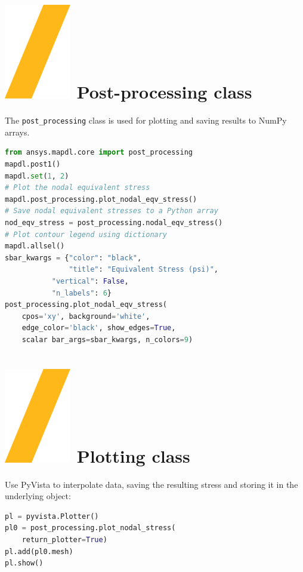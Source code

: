 \documentclass[9pt,landscape]{article}
\begin{document}
\begin{multicols}{3}
\section{\includegraphics[height=\fontcharht\font`\S]{slash.png} Post-processing class}
The \texttt{post_processing} class is used for plotting and saving results to NumPy arrays.
\begin{lstlisting}[language=Python]
from ansys.mapdl.core import post_processing
mapdl.post1()
mapdl.set(1, 2)
# Plot the nodal equivalent stress
mapdl.post_processing.plot_nodal_eqv_stress()
# Save nodal equivalent stresses to a Python array
nod_eqv_stress = post_processing.nodal_eqv_stress()
# Plot contour legend using dictionary
mapdl.allsel()
sbar_kwargs = {"color": "black",
               "title": "Equivalent Stress (psi)",
	       "vertical": False,
	       "n_labels": 6}
post_processing.plot_nodal_eqv_stress(
    cpos='xy', background='white',
    edge_color='black', show_edges=True,
    scalar bar_args=sbar_kwargs, n_colors=9)
\end{lstlisting} 
\vfill

\section{\includegraphics[height=\fontcharht\font`\S]{slash.png} Plotting class}
Use PyVista to interpolate data, saving the resulting stress and storing it in the underlying  object:
\begin{lstlisting}[language=Python]
pl = pyvista.Plotter()
pl0 = post_processing.plot_nodal_stress(
    return_plotter=True)
pl.add(pl0.mesh)
pl.show()
\end{lstlisting} 


\end{multicols}
\end{document}
